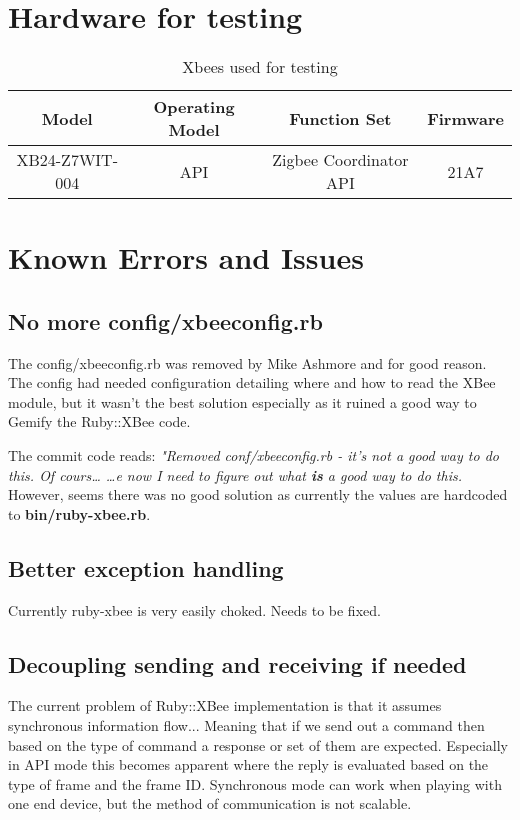\setlength{\parindent}{0pt}
\section{Hardware for testing}
\begin{table}[ht]
\caption{Xbees used for testing}
\centering
\begin{tabular}{c c c c}
\hline\hline
Model & Operating Model & Function Set & Firmware \\ [0.5ex] %
\hline
XB24-Z7WIT-004 & API & Zigbee Coordinator API & 21A7 \\ [1ex]
\hline
\end{tabular}
\label{table:nonlin}
\end{table}

\section{Known Errors and Issues}
\subsection{No more config/xbeeconfig.rb}
The config/xbeeconfig.rb was removed by Mike Ashmore and for good reason. The config had needed configuration detailing where and how to read the XBee module, but it wasn't the best solution especially as it ruined a good way to Gemify the Ruby::XBee code.

\noindent The commit code reads: \textit{"Removed conf/xbeeconfig.rb - it's not a good way to do this. Of cours… …e now I need to figure out what \textbf{is} a good way to do this.} However, seems there was no good solution as currently the values are hardcoded to \textbf{bin/ruby-xbee.rb}.

\subsection{Better exception handling}
Currently ruby-xbee is very easily choked. Needs to be fixed.

%
\subsection{Decoupling sending and receiving if needed}
The current problem of Ruby::XBee implementation is that it assumes synchronous information flow... Meaning that if we send out a command then based on the type of command a response or set of them are expected. Especially in API mode this becomes apparent where the reply is evaluated based on the type of frame and the frame ID. Synchronous mode can work when playing with one end device, but the method of communication is not scalable.

